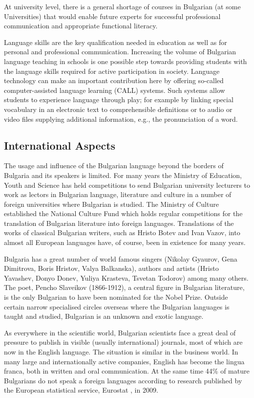 \begin{multicols}{2}
At university level, there is a general shortage of courses in Bulgarian (at some Universities) that would enable future experts for successful professional communication and appropriate functional literacy.

Language skills are the key qualification needed in education as well as for personal and professional communication. Increasing the volume of Bulgarian language teaching in schools is one possible step towards providing students with the language skills required for active participation in society. Language technology can make an important contribution here by offering so-called computer-assisted language learning (CALL) systems. Such systems allow students to experience language through play; for example by linking special vocabulary in an electronic text to comprehensible definitions or to audio or video files supplying additional information, e.g., the pronunciation of a word. 


\subsection{International Aspects}


The usage and influence of the Bulgarian language beyond the borders of Bulgaria and its speakers is limited. For many years the Ministry of Education, Youth and Science has held competitions to send Bulgarian university lecturers to work as lectors in Bulgarian language, literature and culture in a number of foreign universities where Bulgarian is studied. The Ministry of Culture established the National Culture Fund which holds regular competitions for the translation of Bulgarian literature into foreign languages. Translations of the works of classical Bulgarian writers, such as Hristo Botev and Ivan Vazov, into almost all European languages have, of course, been in existence for many years. 

Bulgaria has a great number of world famous singers (Nikolay Gyaurov, Gena Dimitrova, Boris Hristov, Valya Balkanska), authors and artists (Hristo Yavashev, Donyo Donev, Yuliya Krasteva, Tsvetan Todorov) among many others. The poet, Pencho Slaveikov (1866-1912), a central figure in Bulgarian literature, is the only Bulgarian to have been nominated for the Nobel Prize. Outside certain narrow specialised circles overseas where the Bulgarian languages is taught and studied, Bulgarian is an unknown and exotic language.

As everywhere in the scientific world, Bulgarian scientists face a great deal of pressure to publish in visible (usually international) journals, most of which are now in the English language. The situation is similar in the business world. In many large and internationally active companies, English has become the lingua franca, both in written and oral communication. At the same time 44\% of mature Bulgarians do not speak a foreign languages according to research published by the European statistical service, Eurostat \cite{epp}, in 2009. 


\end{multicols}
